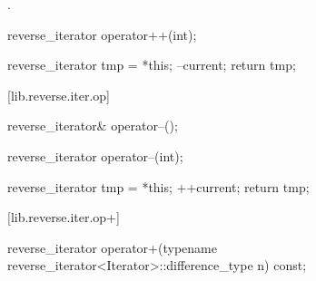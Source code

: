 \begin{itemdescr}
\pnum
\effects
{}

\pnum
\returns
{}.
\end{itemdescr}

%
%
\begin{itemdecl}
reverse_iterator operator++(int);
\end{itemdecl}

\begin{itemdescr}
\pnum
\effects
\begin{codeblock}
    reverse_iterator tmp = *this;
    --current;
    return tmp;
\end{codeblock}
\end{itemdescr}

[lib.reverse.iter.op\dcr]{}

%
\begin{itemdecl}
reverse_iterator& operator--();
\end{itemdecl}

\begin{itemdescr}
\pnum
\effects
{}

\pnum
\returns
{}
\end{itemdescr}

%
%
\begin{itemdecl}
reverse_iterator operator--(int);
\end{itemdecl}

\begin{itemdescr}
\pnum
\effects
\begin{codeblock}
    reverse_iterator tmp = *this;
    ++current;
    return tmp;
\end{codeblock}
\end{itemdescr}

[lib.reverse.iter.op+]{}

%
\begin{itemdecl}
reverse_iterator
operator+(typename reverse_iterator<Iterator>::difference_type n) const;
\end{itemdecl}

\begin{itemdescr}
\pnum
\returns
{}
\end{itemdescr}

